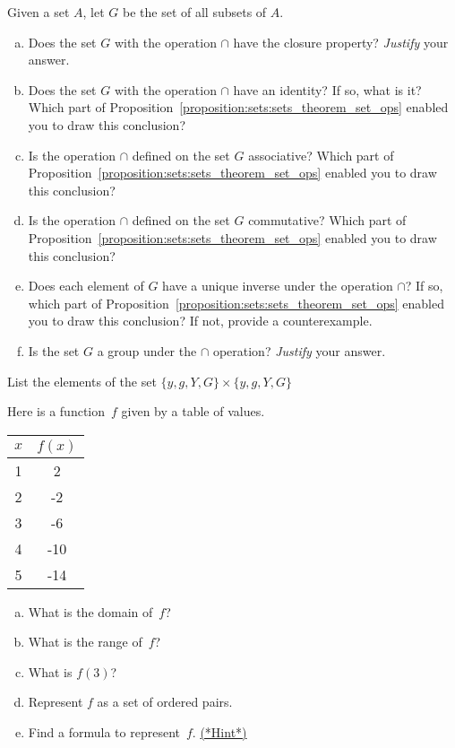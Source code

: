 \begin{exercise}\label{exercise:TestPractice:cap_group}
Given a set $A$, let $G$ be the set of all subsets of $A$. 
\begin{enumerate}[(a)]
\item
Does the set $G$  with the operation $\cap$ have the closure property? \emph{Justify} your answer.
\item
Does the set $G$  with the operation $\cap$ have an identity? If so, what is it? Which part of  Proposition~\ref{proposition:sets:sets_theorem_set_ops} enabled you to draw this conclusion?
\item
Is the operation $\cap$ defined on the set $G$ associative? Which part of  Proposition~\ref{proposition:sets:sets_theorem_set_ops} enabled you to draw this conclusion?
\item
Is the operation $\cap$ defined on the set $G$ commutative? Which part of  Proposition~\ref{proposition:sets:sets_theorem_set_ops} enabled you to draw this conclusion?
\item
Does each element of $G$ have a unique inverse under the operation $\cap$? If so, which part of  Proposition~\ref{proposition:sets:sets_theorem_set_ops} enabled you to draw this conclusion? If not, provide a counterexample.
\item
Is the set $G$ a group under the $\cap$ operation?  \emph{Justify} your answer.
\end{enumerate}
\end{exercise} 

\begin{exercise}
List the elements of the set
$\{y,g,Y,G\} \times \{y,g,Y,G\}$
\end{exercise}

\begin{exercise}\label{exercise:TestPractice:funtable}
Here is a function~$f$ given by a table of values.

\begin{center}
\begin{tabular}{c|c}
$x$ & $f(x)$ \\ \hline

1 & 2 \\
2 & -2 \\
3 & -6 \\
4 & -10 \\
5 & -14 \\
\end{tabular}
\end{center}

\begin{enumerate}[(a)]
\item  \label{FunctionByTableEx-domain}
What is the domain of~$f$?
\item \label{FunctionByTableEx-range}
What is the range of~$f$? 
\item  \label{FunctionByTableEx-f(3)}
What is $f(3)$?
\item  \label{FunctionByTableEx-pairs}
Represent $f$ as a set of ordered pairs.
\item  \label{FunctionByTableEx-formula}
Find a formula to represent~$f$.
\hyperref[sec:functions:hints]{(*Hint*)}
\end{enumerate}
\end{exercise}

